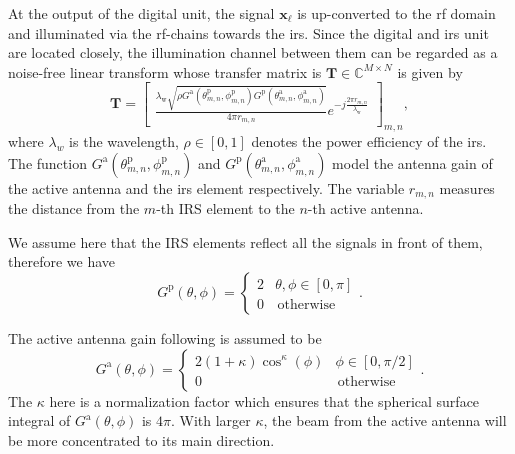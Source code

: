 \documentclass[12pt,draftclsnofoot,onecolumn,journal]{IEEEtran}
\begin{document}
At the output of the digital unit, the signal $\mathbf{x}_\ell$ is up-converted to the \ac{rf} domain and illuminated via the \ac{rf}-chains towards the \ac{irs}. Since the digital and \ac{irs} unit are located closely, the illumination channel between them can be regarded as a noise-free linear transform whose transfer matrix is  $\mathbf T\in\mathbb C^{M\times N}$ is given by \cite{jamali2020intelligent}
\begin{equation}
\mathbf T=\begin{bmatrix}
\frac{\lambda_{\mathrm w}\sqrt{\rho G^{\mathrm a}(\theta^{\mathrm p}_{m,n}, \phi^{\mathrm p}_{m,n})G^{\mathrm p}(\theta^{\mathrm a}_{m,n}, \phi^{\mathrm a}_{m,n})}}{4\pi r_{m,n}}e^{-j\frac{2\pi r_{m,n}}{\lambda_{\mathrm w}}}
\end{bmatrix}_{m,n},
\label{eq:illuminationbasic}
\end{equation}
where $\lambda_w$ is the wavelength,  $\rho\in[0,1]$ denotes the power efficiency of the \ac{irs}. The function $G^{\mathrm a}(\theta^{\mathrm p}_{m,n}, \phi^{\mathrm p}_{m,n})$ and $G^{\mathrm p}(\theta^{\mathrm a}_{m,n}, \phi^{\mathrm a}_{m,n})$ model the antenna gain of the active antenna and the \ac{irs} element respectively. The variable $r_{m,n}$ measures the distance from the $m$-th IRS element to the $n$-th active antenna.


We assume here that the IRS elements reflect all the signals in front of them, therefore we have 
\begin{equation}
G^{\mathrm p}(\theta, \phi)=\begin{cases}
2 & \theta, \phi\in[0,\pi] \\
0 & \, \text{otherwise}
\end{cases}.
\end{equation}

The active antenna gain following \cite{jamali2020intelligent} is assumed to be 
\begin{equation}
G^{\mathrm a}(\theta, \phi)=\begin{cases}
2(1+\kappa)\cos^\kappa(\phi) & \phi\in[0,\pi/2] \\
0 & \, \text{otherwise}
\end{cases}.
\end{equation}
The $\kappa$ here is a normalization factor which ensures that the spherical surface integral of $G^{\mathrm a}(\theta, \phi)$ is $4\pi$. With larger $\kappa$, the beam from the active antenna will be more concentrated to its main direction.
\end{document}
